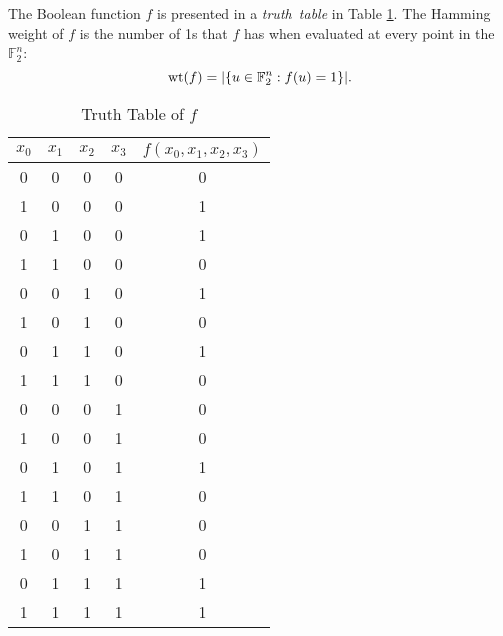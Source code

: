 \documentclass[english]{article}
\def\gftwo{\mathbb{F}_2}
\theoremstyle{plain}
\theoremstyle{definition}
\theoremstyle{remark}
\begin{document}
\par The Boolean function $f$ is presented in a {\em truth\ table} in 
Table \ref{tab:truth-table}. The Hamming weight of $f$ is the number of 1s
that $f$ has when evaluated at every point in the $\gftwo^n$: 
\[
{\rm wt}(f)=\lvert\{u\in\gftwo^n:f(u)=1\}\rvert.
\]
\begin{table}
  \centering
  \begin{tabular}{|c|c|c|c||c|}
    \hline
    $x_0$&$x_1$&$x_2$&$x_3$&$f(x_0,x_1,x_2,x_3)$\\
    \hline
    0&0&0&0&0\\
    1&0&0&0&1\\
    0&1&0&0&1\\
    1&1&0&0&0\\
    0&0&1&0&1\\
    1&0&1&0&0\\
    0&1&1&0&1\\
    1&1&1&0&0\\
    0&0&0&1&0\\
    1&0&0&1&0\\
    0&1&0&1&1\\
    1&1&0&1&0\\
    0&0&1&1&0\\
    1&0&1&1&0\\
    0&1&1&1&1\\
    1&1&1&1&1\\
    \hline
  \end{tabular}
  \caption{Truth Table of $f$}
  \label{tab:truth-table}
\end{table}
\end{document}
